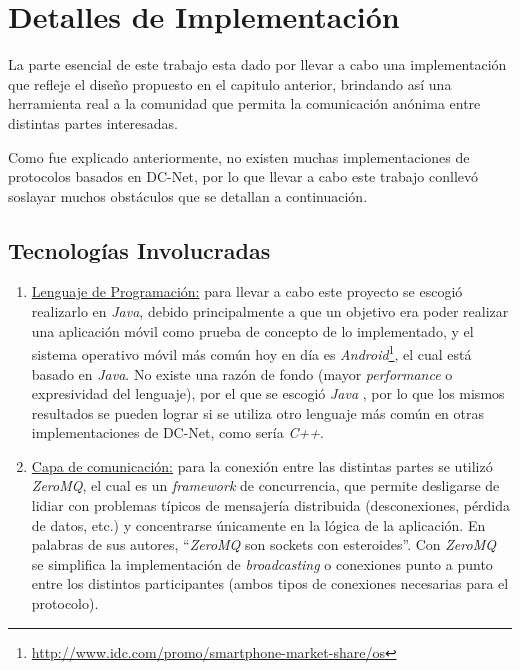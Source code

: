 \chapter{Detalles de Implementación}

La parte esencial de este trabajo esta dado por llevar a cabo una 
implementación que refleje el diseño propuesto en el capitulo anterior, 
brindando así una herramienta real a la comunidad que permita la comunicación 
anónima entre distintas partes interesadas.

Como fue explicado anteriormente, no existen muchas implementaciones de 
protocolos basados en DC-Net, por lo que llevar a cabo este trabajo conllevó 
soslayar muchos obstáculos que se detallan a continuación.

\section{Tecnologías Involucradas}

\begin{enumerate}
    \item \underline{Lenguaje de Programación:} para llevar a cabo este 
    proyecto se escogió realizarlo en \emph{Java}, debido principalmente a que 
    un objetivo era poder realizar una aplicación móvil como prueba de 
    concepto de lo implementado, y el sistema operativo móvil más común hoy en 
    día es \emph{Android}\footnote{\url{http://www.idc.com/promo/smartphone-market-share/os}}, el 
    cual está basado en \emph{Java}. No existe una razón de fondo (mayor \emph{
    performance} o expresividad del lenguaje), por el que se escogió \emph{Java
    }, por lo que los mismos resultados se pueden lograr si se utiliza otro 
    lenguaje más común en otras implementaciones de DC-Net, como sería \emph{
    C++}.

    \item \underline{Capa de comunicación:} para la conexión entre las 
    distintas partes se utilizó \emph{ZeroMQ}, el cual es un \emph{framework} 
    de concurrencia, que permite desligarse de lidiar con problemas típicos de 
    mensajería distribuida (desconexiones, pérdida de datos, etc.) y 
    concentrarse únicamente en la lógica de la aplicación. En palabras de sus 
    autores, ``\emph{ZeroMQ} son sockets con esteroides''. Con \emph{ZeroMQ} 
    se simplifica la implementación de \emph{broadcasting} o conexiones punto 
    a punto entre los distintos participantes (ambos tipos de conexiones 
    necesarias para el protocolo).
\end{enumerate}

